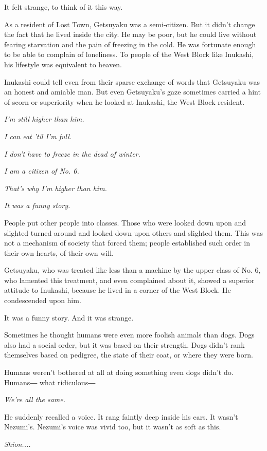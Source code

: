 It felt strange, to think of it this way.

As a resident of Lost Town, Getsuyaku was a semi-citizen. But it didn't
change the fact that he lived inside the city. He may be poor, but he
could live without fearing starvation and the pain of freezing in the
cold. He was fortunate enough to be able to complain of loneliness. To
people of the West Block like Inukashi, his lifestyle was equivalent to
heaven.

Inukashi could tell even from their sparse exchange of words that
Getsuyaku was an honest and amiable man. But even Getsuyaku's gaze
sometimes carried a hint of scorn or superiority when he looked at
Inukashi, the West Block resident.

\emph{I'm still higher than him.}

\emph{I can eat 'til I'm full.}

\emph{I don't have to freeze in the dead of winter.}

\emph{I am a citizen of No. 6.}

\emph{That's why I'm higher than him.}

\emph{It was a funny story.}

People put other people into classes. Those who were looked down upon
and slighted turned around and looked down upon others and slighted
them. This was not a mechanism of society that forced them; people
established such order in their own hearts, of their own will.

Getsuyaku, who was treated like less than a machine by the upper class
of No. 6, who lamented this treatment, and even complained about it,
showed a superior attitude to Inukashi, because he lived in a corner of
the West Block. He condescended upon him.

It was a funny story. And it was strange.

Sometimes he thought humans were even more foolish animals than dogs.
Dogs also had a social order, but it was based on their strength. Dogs
didn't rank themselves based on pedigree, the state of their coat, or
where they were born.

Humans weren't bothered at all at doing something even dogs didn't do.
Humans― what ridiculous―

\emph{We're all the same.}

He suddenly recalled a voice. It rang faintly deep inside his ears. It
wasn't Nezumi's. Nezumi's voice was vivid too, but it wasn't as soft as
this.

\emph{Shion....}


